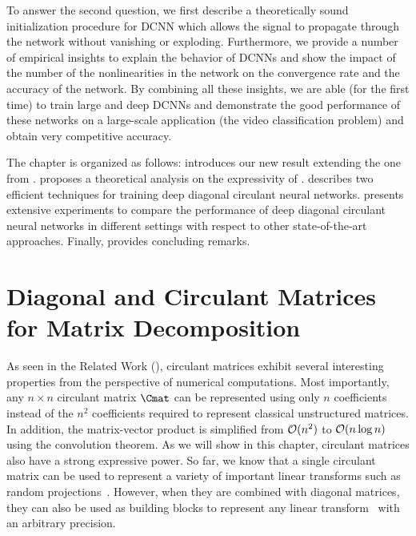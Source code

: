 To answer the second question, we first describe a theoretically sound initialization procedure for DCNN which allows the signal to propagate through the network without vanishing or exploding.
Furthermore, we provide a number of empirical insights to explain the behavior of DCNNs and show the impact of the number of the nonlinearities in the network on the convergence rate and the accuracy of the network. 
By combining all these insights, we are able (for the first time) to train large and deep DCNNs and demonstrate the good performance of these networks on a large-scale application (the \yt video classification problem) and obtain very competitive accuracy. 

The chapter is organized as follows:
 introduces our new result extending the one from \citet{huhtanen2015factoring}.
 proposes a theoretical analysis on the expressivity of \dcnns.
 describes two efficient techniques for training deep diagonal circulant neural networks.
 presents extensive experiments to compare the performance of deep diagonal circulant neural networks in different settings with respect to other state-of-the-art approaches.
Finally,  provides concluding remarks. 




\section{Diagonal and Circulant Matrices for Matrix Decomposition}
\label{section:ch4-diagonal_and_circulant_matrices_for_matrix_decomposition}

As seen in the Related Work (), circulant matrices exhibit several interesting properties from the perspective of numerical computations.
Most importantly, any $n \times n$ circulant matrix $\Cmat$ can be represented using only $n$ coefficients instead of the $n^2$ coefficients required to represent classical unstructured matrices.
In addition, the matrix-vector product is simplified from $\mathcal{O}(n^2)$ to $\mathcal{O}(n \log n)$ using the  convolution theorem.
As we will show in this chapter, circulant matrices also have a strong expressive power.
So far, we know that a single circulant matrix can be used to represent a variety of important linear transforms such as random projections~\cite{hinrichs2011johnson}. 
However, when they are combined with diagonal matrices, they can also be used as building blocks to represent any linear transform~\cite{schmid2000decomposing,huhtanen2015factoring} with an arbitrary precision.


